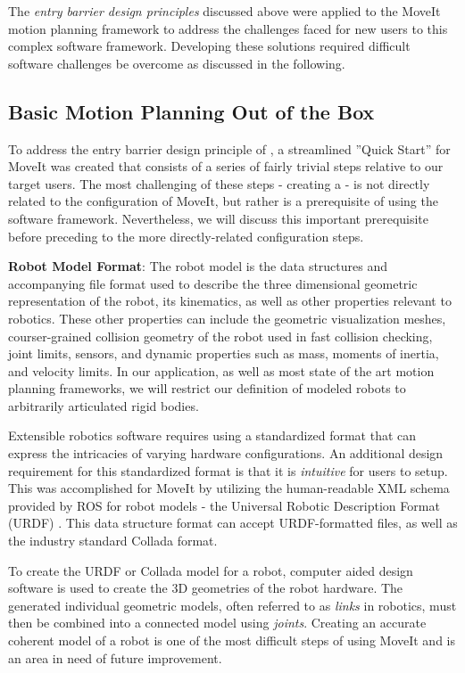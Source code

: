 \documentclass[10pt,journal,compsoc]{joser1}
\begin{document}
{The \textit{entry barrier design principles} discussed above were applied to the MoveIt motion planning framework to address the challenges faced for new users to this complex software framework. Developing these solutions required difficult software challenges be overcome as discussed in the following.

\subsection{Basic Motion Planning Out of the Box}

To address the entry barrier design principle of , a streamlined ''Quick Start'' for MoveIt was created that consists of a series of fairly trivial steps relative to our target users. The most challenging of these steps - creating a  - is not directly related to the configuration of MoveIt, but rather is a prerequisite of using the software framework. Nevertheless, we will discuss this important prerequisite before preceding to the more directly-related configuration steps. 

{\bf Robot Model Format}: The robot model is the data structures and accompanying file format used to describe the three dimensional geometric representation of the robot, its kinematics, as well as other properties relevant to robotics. These other properties can include the geometric visualization meshes, courser-grained collision geometry of the robot used in fast collision checking, joint limits, sensors, and dynamic properties such as mass, moments of inertia, and velocity limits. In our application, as well as most state of the art motion planning frameworks, we will restrict our definition of modeled robots to arbitrarily articulated rigid bodies.

Extensible robotics software requires using a standardized format that can express the intricacies of varying hardware configurations. An additional design requirement for this standardized format is that it is \textit{intuitive} for users to setup. This was accomplished for MoveIt by utilizing the human-readable XML schema provided by ROS for robot models - the Universal Robotic Description Format (URDF) \cite{urdf}. This data structure format can accept URDF-formatted files, as well as the industry standard Collada \cite{collada} format.

To create the URDF or Collada model for a robot, computer aided design software is used to create the 3D geometries of the robot hardware. The generated individual geometric models, often referred to as \textit{links} in robotics, must then be combined into a connected model using \textit{joints}. Creating an accurate coherent model of a robot is one of the most difficult steps of using MoveIt and is an area in need of future improvement.

}
\end{document}
